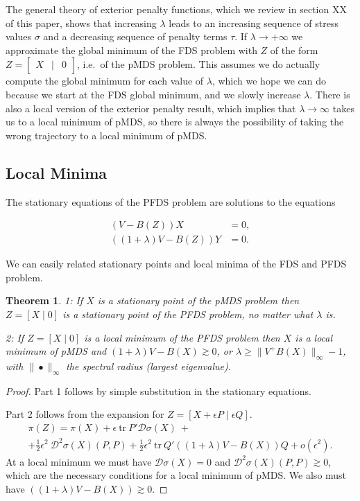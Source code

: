 \documentclass[
  12pt,
]{book}
\newtheorem{theorem}{Theorem}[chapter]
\theoremstyle{definition}
\theoremstyle{definition}
\theoremstyle{definition}
\theoremstyle{definition}
\theoremstyle{remark}
\begin{document}
The general theory of exterior penalty functions, which we review in section XX of this paper, shows that increasing \(\lambda\) leads to an increasing sequence of stress values \(\sigma\) and a decreasing sequence of penalty terms \(\tau\).
If \(\lambda\rightarrow+\infty\) we approximate the global minimum of the FDS problem with \(Z\) of the form \(Z=\begin{bmatrix}X&\mid&0\end{bmatrix}\), i.e.~of the pMDS problem. This assumes we do actually compute the global minimum for each value of \(\lambda\), which we hope we can do because we start at the FDS global minimum, and we slowly increase \(\lambda\). There is also a local version of the exterior penalty result, which implies that \(\lambda\rightarrow\infty\) takes us to a local minimum of pMDS, so there is always the possibility of taking the wrong trajectory to a local minimum of pMDS.

\hypertarget{local-minima}{%
\subsection{Local Minima}\label{local-minima}}

The stationary equations of the PFDS problem are solutions to the equations

\begin{align}
(V-B(Z))X&=0,\\
((1+\lambda)V-B(Z))Y&=0.
\end{align}

We can easily related stationary points and local minima of the FDS and PFDS problem.

\begin{theorem}
\protect\hypertarget{thm:globlocal}{}{\label{thm:globlocal} }1: If \(X\) is a stationary point of the pMDS problem then \(Z=[X\mid 0]\) is a stationary point of the PFDS problem, no matter what \(\lambda\) is.

2: If \(Z=[X\mid 0]\) is a local minimum of the PFDS problem then \(X\) is a local minimum of pMDS and
\((1+\lambda)V-B(X)\gtrsim 0\), or \(\lambda\geq\|V^+B(X)\|_\infty-1\), with \(\|\bullet\|_\infty\) the spectral radius (largest eigenvalue).
\end{theorem}

\begin{proof}
Part 1 follows by simple substitution in the stationary equations.

Part 2 follows from the expansion for \(Z=[X+\epsilon P\mid\epsilon Q]\).
\begin{multline}\label{E:expand2}
\pi(Z)=\pi(X)+\epsilon\ \text{tr}\ P'\mathcal{D}\sigma(X)\ +\\+\frac12\epsilon^2\ \mathcal{D}^2\sigma(X)(P,P)+\frac12\epsilon^2\ \text{tr}\ Q'((1+\lambda)V-B(X))Q+o(\epsilon^2).
\end{multline}
At a local minimum we must have \(\mathcal{D}\sigma(X)=0\) and \(\mathcal{D}^2\sigma(X)(P,P)\gtrsim 0\), which are the necessary conditions for a local minimum of pMDS. We also must have \(((1+\lambda)V-B(X))\gtrsim 0\).
\end{proof}
\end{document}

